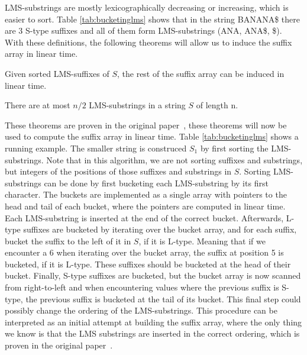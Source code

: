 LMS-substrings are mostly lexicographically decreasing or increasing, which is easier to
sort. Table \ref{tab:bucketinglms} shows that in the string BANANA\$ there are 3 S-type
suffixes and all of them form LMS-substrings (ANA, ANA\$, \$). With these definitions, the
following theorems will allow us to induce the suffix array in linear time.

\begin{theorem}

    Given sorted LMS-suffixes of $S$, the rest of the suffix array can be induced in linear
    time. 

\end{theorem}

\begin{theorem}
    There are at most $n / 2$ LMS-substrings in a string $S$ of length n.
\end{theorem}

These theorems are proven in the original paper~\cite{LinearTimeSuffixArraySAIS}, these
theorems will now be used to compute the suffix array in linear time. Table
\ref{tab:bucketinglms} shows a running example. The smaller string is construced $S_1$ by
first sorting the LMS-substrings. Note that in this algorithm, we are not sorting suffixes
and substrings, but integers of the positions of those suffixes and substrings in $S$.
Sorting LMS-substrings can be done by first bucketing each LMS-substring by its first
character. The buckets are implemented as a single array with pointers to the head and
tail of each bucket, where the pointers are computed in linear time. Each LMS-substring is
inserted at the end of the correct bucket. Afterwards, L-type suffixes are bucketed by
iterating over the bucket array, and for each suffix, bucket the suffix to the left of it
in $S$, if it is L-type. Meaning that if we encounter a 6 when iterating over the bucket
array, the suffix at position 5 is bucketed, if it is L-type. These suffixes should be
bucketed at the head of their bucket. Finally, S-type suffixes are bucketed, but the
bucket array is now scanned from right-to-left and when encountering values where the
previous suffix is S-type, the previous suffix is bucketed at the tail of its bucket. This
final step could possibly change the ordering of the LMS-substrings. This procedure can be
interpreted as an initial attempt at building the suffix array, where the only thing we
know is that the LMS substrings are inserted in the correct ordering, which is proven in
the original paper~\cite{LinearTimeSuffixArraySAIS}. 

